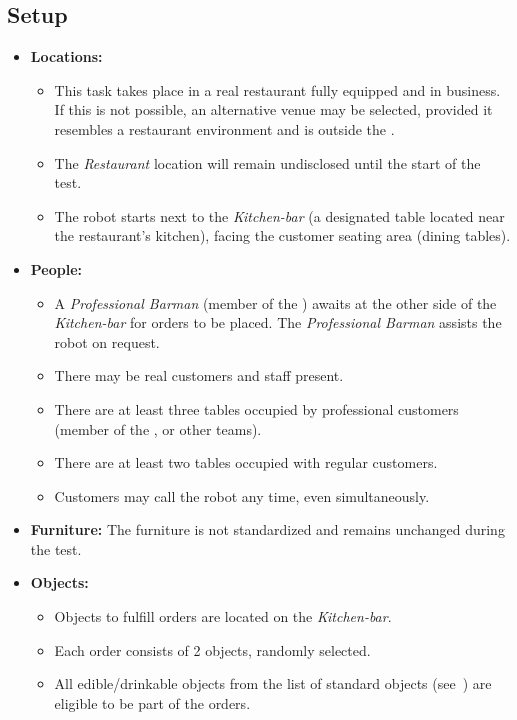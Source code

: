 \subsection*{Setup}
\begin{itemize}[nosep]	
	\item \textbf{Locations:} 
	\begin{itemize}
		\item This task takes place in a real restaurant fully equipped and in business. If this is not possible, an alternative venue may be selected, provided it resembles a restaurant environment and is outside the \Arena{}.
		\item The \emph{Restaurant} location will remain undisclosed until the start of the test.
		\item The robot starts next to the \emph{Kitchen-bar} (a designated table located near the restaurant's kitchen), facing the customer seating area (dining tables).
	\end{itemize}	 
	\item \textbf{People:} 
	\begin{itemize}
		\item  A \emph{Professional Barman} (member of the \TC{}) awaits at the other side of the \emph{Kitchen-bar} for orders to be placed. The \emph{Professional Barman} assists the robot on request.
		\item There may be real customers and staff present.
		\item There are at least three tables occupied by professional customers (member of the \OC{}, \TC{} or other teams). 
		\item There are at least two tables occupied with regular customers.
		\item Customers may call the robot any time, even simultaneously.
	\end{itemize}

	\item \textbf{Furniture:} The furniture is not standardized and remains unchanged during the test.

	\item \textbf{Objects:} 
	\begin{itemize}
	\item Objects to fulfill orders are located on the \textit{Kitchen-bar}.
	\item Each order consists of 2 objects, randomly selected.
	\item All edible/drinkable objects from the list of standard objects (see~) are eligible to be part of the orders.
	\end{itemize}
\end{itemize}

